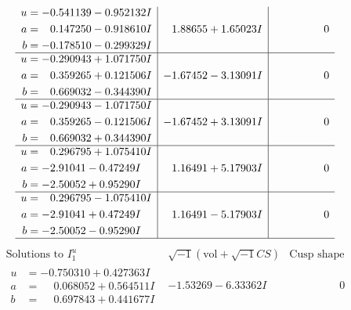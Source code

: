 \documentclass[1p]{elsarticle_modified}
\theoremstyle{definition}
\newcommand{\I}{\sqrt{-1}}
\begin{document}
$$\begin{array}{c|c|c}
\begin{aligned}
u &= -0.541139 - 0.952132 I \\
a &= \phantom{-}0.147250 - 0.918610 I \\
b &= -0.178510 - 0.299329 I\end{aligned}
 & \phantom{-}1.88655 + 1.65023 I & \phantom{-0.000000 } 0 \\ \hline\begin{aligned}
u &= -0.290943 + 1.071750 I \\
a &= \phantom{-}0.359265 + 0.121506 I \\
b &= \phantom{-}0.669032 - 0.344390 I\end{aligned}
 & -1.67452 - 3.13091 I & \phantom{-0.000000 } 0 \\ \hline\begin{aligned}
u &= -0.290943 - 1.071750 I \\
a &= \phantom{-}0.359265 - 0.121506 I \\
b &= \phantom{-}0.669032 + 0.344390 I\end{aligned}
 & -1.67452 + 3.13091 I & \phantom{-0.000000 } 0 \\ \hline\begin{aligned}
u &= \phantom{-}0.296795 + 1.075410 I \\
a &= -2.91041 - 0.47249 I \\
b &= -2.50052 + 0.95290 I\end{aligned}
 & \phantom{-}1.16491 + 5.17903 I & \phantom{-0.000000 } 0 \\ \hline\begin{aligned}
u &= \phantom{-}0.296795 - 1.075410 I \\
a &= -2.91041 + 0.47249 I \\
b &= -2.50052 - 0.95290 I\end{aligned}
 & \phantom{-}1.16491 - 5.17903 I & \phantom{-0.000000 } 0\\
 \hline 
 \end{array}$$\newpage$$\begin{array}{c|c|c}  
\text{Solutions to }I^u_{1}& \I (\text{vol} + \sqrt{-1}CS) & \text{Cusp shape}\\
 \hline 
\begin{aligned}
u &= -0.750310 + 0.427363 I \\
a &= \phantom{-}0.068052 + 0.564511 I \\
b &= \phantom{-}0.697843 + 0.441677 I\end{aligned}
 & -1.53269 - 6.33362 I & \phantom{-0.000000 } 0 \\ \hline\begin{aligned}

\end{aligned}
\end{array}$$
\end{document}
